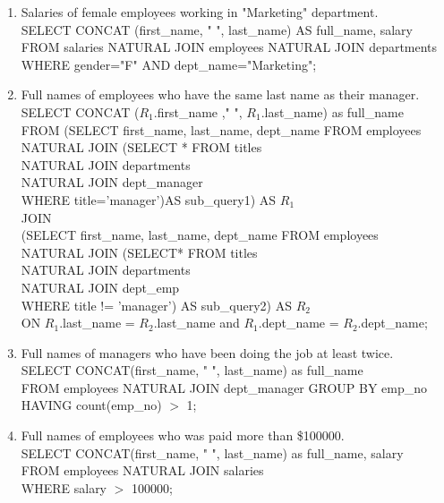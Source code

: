 \documentclass{article}
\begin{document}
\begin{enumerate}
	\item Salaries of female employees working in "Marketing" department.\\
	
	SELECT CONCAT (first\_name, " ", last\_name) AS full\_name, salary 
		FROM salaries NATURAL JOIN employees NATURAL JOIN departments
		WHERE gender="F" AND dept\_name="Marketing";
	
	\item Full names of employees who have the same last name as their manager.\\
	
		SELECT CONCAT ($R_{1}$.first\_name ," ", $R_{1}$.last\_name) as full\_name\\
		FROM (SELECT first\_name, last\_name, dept\_name FROM employees \\
		NATURAL JOIN (SELECT * FROM titles\\
		NATURAL JOIN departments\\
		NATURAL JOIN dept\_manager \\
		WHERE title='manager')AS sub\_query1) AS $R_{1}$\\
		JOIN\\
		(SELECT first\_name, last\_name, dept\_name FROM employees\\
	    NATURAL JOIN (SELECT* FROM titles\\
	    NATURAL JOIN departments\\
	    NATURAL JOIN dept\_emp \\
		WHERE title != 'manager') AS sub\_query2) AS $R_{2}$\\
		ON $R_{1}$.last\_name = $R_{2}$.last\_name and $R_{1}$.dept\_name = $R_{2}$.dept\_name; 	
		
	\item Full names of managers who have been doing the job at least twice.\\
	
	SELECT CONCAT(first\_name, " ", last\_name) as full\_name\\
	FROM employees NATURAL JOIN dept\_manager
	GROUP BY emp\_no 
	HAVING count(emp\_no) $>$ 1;

	\item Full names of employees who was paid more than \$100000.\\
	
	SELECT CONCAT(first\_name, " ", last\_name) as full\_name, salary \\
	FROM employees	NATURAL JOIN salaries\\
	WHERE salary $>$ 100000;
	

\end{enumerate}
\end{document}
